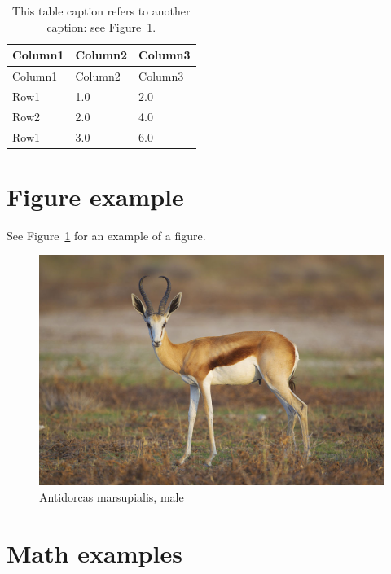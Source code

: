 \documentclass[letterpaper,             %
               oneside,                 %
               \pointsize]              %
               {memoir}
\begin{document}
\begin{longtable}[]{@{}lll@{}}
\caption{This table caption refers to another caption: see
Figure~\ref{fig-figexample}.}\tabularnewline
\toprule\noalign{}
Column1 & Column2 & Column3 \\
\midrule\noalign{}
\endfirsthead
\toprule\noalign{}
Column1 & Column2 & Column3 \\
\midrule\noalign{}
\endhead
\bottomrule\noalign{}
\endlastfoot
Row1 & 1.0 & 2.0 \\
Row2 & 2.0 & 4.0 \\
Row1 & 3.0 & 6.0 \\
\end{longtable}

\hypertarget{figure-example}{%
\section{Figure example}\label{figure-example}}

See Figure~\ref{fig-figexample} for an example of a figure.

\begin{figure}

{\centering \includegraphics{chapters/../img/antidorcas.png}

}

\caption{\label{fig-figexample}Antidorcas marsupialis, male}

\end{figure}

\hypertarget{math-examples}{%
\section{Math examples}\label{math-examples}}
\end{document}
